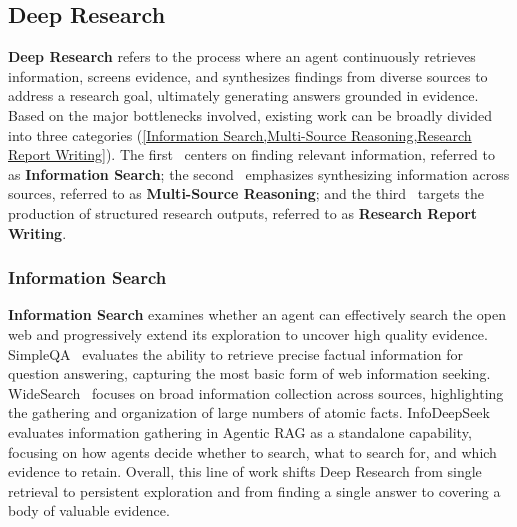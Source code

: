 \subsection{Deep Research}
\label{sec:Deep Research}

\textbf{Deep Research} refers to the process where an agent continuously retrieves information, screens evidence, and synthesizes findings from diverse sources to address a research goal, ultimately generating answers grounded in evidence. Based on the major bottlenecks involved, existing work can be broadly divided into three categories (\cref{Information Search,Multi-Source Reasoning,Research Report Writing}). The first~\cite{WebWalker,WideSearch,InfoDeepSeek} centers on finding relevant information, referred to as \textbf{Information Search}; the second~\cite{GAIA,BrowseComp,Conflicts,BrowseComp-ZH} emphasizes synthesizing information across sources, referred to as \textbf{Multi-Source Reasoning}; and the third~\cite{DeepResearch-Bench,DeepResearchGym,DR_BENCH} targets the production of structured research outputs, referred to as \textbf{Research Report Writing}.


\subsubsection{Information Search}
\label{Information Search}
\textbf{Information Search} examines whether an agent can effectively search the open web and progressively extend its exploration to uncover high quality evidence. SimpleQA~\cite{SimpleQA} evaluates the ability to retrieve precise factual information for question answering, capturing the most basic form of web information seeking. 
WideSearch~\cite{WideSearch} focuses on broad information collection across sources, highlighting the gathering and organization of large numbers of atomic facts. 
InfoDeepSeek~\cite{InfoDeepSeek} evaluates information gathering in Agentic RAG as a standalone capability, focusing on how agents decide whether to search, what to search for, and which evidence to retain.
Overall, this line of work shifts Deep Research from single retrieval to persistent exploration and from finding a single answer to covering a body of valuable evidence.


